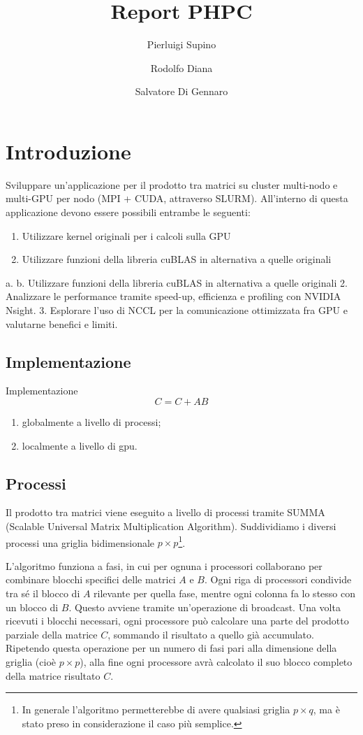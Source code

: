 \documentclass[a4paper]{article}
\title{Report PHPC}
\author{Pierluigi Supino \and Rodolfo Diana \and Salvatore Di Gennaro}
\begin{document}
\maketitle
\tableofcontents

\section{Introduzione}

Sviluppare un’applicazione per il prodotto tra matrici su cluster multi-nodo e multi-GPU per nodo (MPI + CUDA, attraverso SLURM). All’interno di questa applicazione devono essere possibili entrambe le seguenti:
\begin{enumerate}
    \item Utilizzare kernel originali per i calcoli sulla GPU
    \item Utilizzare funzioni della libreria cuBLAS in alternativa a quelle originali
\end{enumerate}
a.
b. Utilizzare funzioni della libreria cuBLAS in alternativa a quelle originali
2. Analizzare le performance tramite speed-up, efficienza e profiling con NVIDIA Nsight.
3. Esplorare l’uso di NCCL per la comunicazione ottimizzata fra GPU e valutarne benefici e limiti.

\subsection{Implementazione}

Implementazione
$$C=C+AB$$

\begin{enumerate}
    \item globalmente a livello di processi;
    \item localmente a livello di gpu.
\end{enumerate}

\subsection{Processi}
Il prodotto tra matrici viene eseguito a livello di processi tramite SUMMA (Scalable Universal Matrix Multiplication Algorithm)\cite{SUMMA}.
Suddividiamo i diversi processi una griglia bidimensionale $p \times p$\footnote{In generale l'algoritmo permetterebbe di avere qualsiasi griglia $p \times q$, ma è stato preso in considerazione il caso più semplice.}.

L'algoritmo funziona a fasi, in cui per ognuna i processori collaborano per combinare blocchi specifici delle matrici $A$ e $B$. Ogni riga di processori condivide tra sé il blocco di $A$ rilevante per quella fase, mentre ogni colonna fa lo stesso con un blocco di $B$. Questo avviene tramite un’operazione di broadcast.
Una volta ricevuti i blocchi necessari, ogni processore può calcolare una parte del prodotto parziale della matrice $C$, sommando il risultato a quello già accumulato. Ripetendo questa operazione per un numero di fasi pari alla dimensione della griglia (cioè $p \times p$), alla fine ogni processore avrà calcolato il suo blocco completo della matrice risultato $C$.
\end{document}
